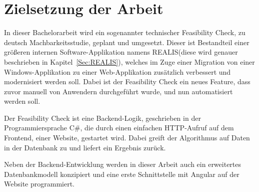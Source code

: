 \section{Zielsetzung der Arbeit}
In dieser Bachelorarbeit wird ein sogenannter technischer Feasibility Check, zu deutsch Machbarkeitsstudie, geplant und umgesetzt. Dieser ist Bestandteil einer größeren internen Software-Applikation namens \ac{REALIS}(diese wird genauer beschrieben in Kapitel~\ref{Sec:REALIS}), welches
im Zuge einer Migration  von einer Windows-Applikation zu einer Web-Applikation zusätzlich verbessert und modernisiert werden soll. Dabei ist der Feasibility Check ein neues Feature, dass zuvor manuell von Anwendern durchgeführt wurde, und nun automatisiert werden soll.

Der Feasibility Check ist eine Backend-Logik, geschrieben in der Programmiersprache C\#, die durch einen einfachen HTTP-Aufruf auf dem Frontend, einer Website, gestartet wird. Dabei greift der Algorithmus auf Daten in der Datenbank zu und liefert ein Ergebnis zurück.

Neben der Backend-Entwicklung werden in dieser Arbeit auch ein erweitertes Datenbankmodell konzipiert und eine erste Schnittstelle mit Angular auf der Website programmiert. 